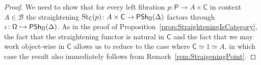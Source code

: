 \documentclass[reqno]{amsart}
\numberwithin{equation}{subsection}
\theoremstyle{plain}
\theoremstyle{definition}
\let\scr=\mathcal
\let\into=\hookrightarrow
\def\BB{\scr B}
\DeclareMathOperator{\id}{id}
\DeclareMathOperator{\IPSh}{\mathsf{PSh}}
\DeclareMathOperator{\Cat}{Cat}
\DeclareMathOperator{\LFib}{LFib}
\DeclareMathOperator{\St}{St}
\newcommand{\op}{\mathrm{op}}
\newcommand{\ord}[1]{\langle#1\rangle}
\newcommand{\Over}[2]{#1_{\hspace{-1pt}/#2}}
\newcommand{\I}[1]{\mathsf{#1}}
\newcommand{\iFun}[2]{{[#1,#2]}}
\begin{document}
\begin{proof}
	We need to show that for every left fibration $p\colon \I{P}\to A\times\I{C}$ in context $A\in\BB$ the straightening $\St_{\I{C}}(p)\colon A\times\I{C}\to\IPSh_{\Univ}(\Delta)$ factors through $\iota\colon\Univ\into\IPSh_{\Univ}(\Delta)$. As in the proof of Proposition~\ref{prop:StraighteningIsCategory}, the fact that the straightening functor is natural in $\I{C}$ and the fact that we may work object-wise in $\I{C}$ allows us to reduce to the case where $\I{C}\simeq 1\simeq A$, in which case the result also immediately follows from Remark~\ref{rem:StraigeningPoint}.
\end{proof}
\end{document}
